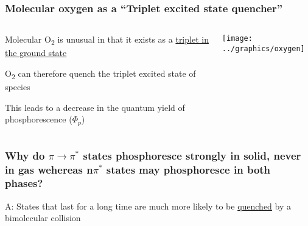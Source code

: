 \documentclass[a4paper,12pt,titlepage]{article}
\begin{document}
\begin{frame}
\frametitle{Molecular oxygen as a ``Triplet excited state quencher''}
\begin{columns}[onlytextwidth]
\begin{column}{.5\textwidth}

Molecular O\textsubscript{2} is unusual in that it exists as a \underline{triplet in the ground state}

O\textsubscript{2} can therefore quench the triplet excited state of species

This leads to a decrease in the quantum yield of phosphorescence (\(\Phi_p\))

\end{column}
\begin{column}{.5\textwidth}

\texttt{[image: ../graphics/oxygen]}
\end{column}
\end{columns}
\end{frame}
	
\begin{frame}
\frametitle{Why do \(\pi \rightarrow \pi^*\) states phosphoresce strongly in solid, never in gas wehereas n\(\pi^*\) states may phosphoresce in both phases?}
A: States that last for a long time are much more likely to be \underline{quenched} by a bimolecular collision

\end{frame}
\end{document}
